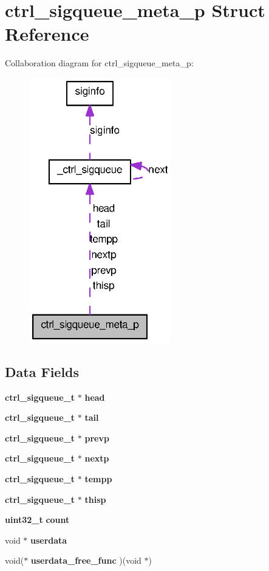 \section{ctrl\_\-sigqueue\_\-meta\_\-p Struct Reference}
\label{structctrl__sigqueue__meta__p}


Collaboration diagram for ctrl\_\-sigqueue\_\-meta\_\-p:
\nopagebreak
\begin{figure}[H]
\begin{center}
\leavevmode
\includegraphics[width=175pt]{structctrl__sigqueue__meta__p__coll__graph}
\end{center}
\end{figure}
\subsection*{Data Fields}
\begin{DoxyCompactItemize}
\item 
{\bf ctrl\_\-sigqueue\_\-t} $\ast$ {\bf head}
\item 
{\bf ctrl\_\-sigqueue\_\-t} $\ast$ {\bf tail}
\item 
{\bf ctrl\_\-sigqueue\_\-t} $\ast$ {\bf prevp}
\item 
{\bf ctrl\_\-sigqueue\_\-t} $\ast$ {\bf nextp}
\item 
{\bf ctrl\_\-sigqueue\_\-t} $\ast$ {\bf tempp}
\item 
{\bf ctrl\_\-sigqueue\_\-t} $\ast$ {\bf thisp}
\item 
{\bf uint32\_\-t} {\bf count}
\item 
void $\ast$ {\bf userdata}
\item 
void($\ast$ {\bf userdata\_\-free\_\-func} )(void $\ast$)
\end{DoxyCompactItemize}



